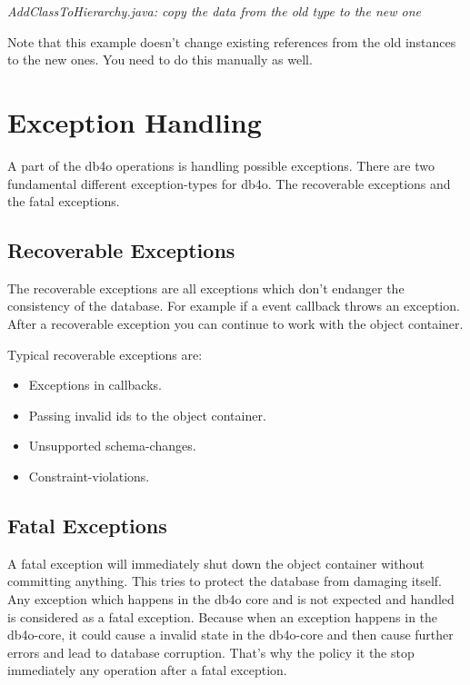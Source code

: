 {\small\itshape AddClassToHierarchy.java: copy the data from the old type to the new one\par}
\medskip

Note that this example doesn't change existing references from the old instances to the new ones. You need to do this manually as well.

\section{Exception Handling}
\label{ref:advanced-topics-exceptions}

A part of the db4o operations is handling possible exceptions. There are two fundamental different exception-types for db4o. The recoverable exceptions and the fatal exceptions.

\subsection*{Recoverable Exceptions}

The recoverable exceptions are all exceptions which don't endanger the consistency of the database. For example if a event callback throws an exception. After a recoverable exception you can continue to work with the object container.

Typical recoverable exceptions are:

\begin{itemize}
\item Exceptions in callbacks.
\item Passing invalid ids to the object container.
\item Unsupported schema-changes.
\item Constraint-violations.
\end{itemize}

\subsection*{Fatal Exceptions}

A fatal exception will immediately shut down the object container without committing anything. This tries to protect the database from damaging itself. Any exception which happens in the db4o core and is not expected and handled is considered as a fatal exception. Because when an exception happens in the db4o-core, it could cause a invalid state in the db4o-core and then cause further errors and lead to database corruption. That's why the policy it the stop immediately any operation after a fatal exception.

